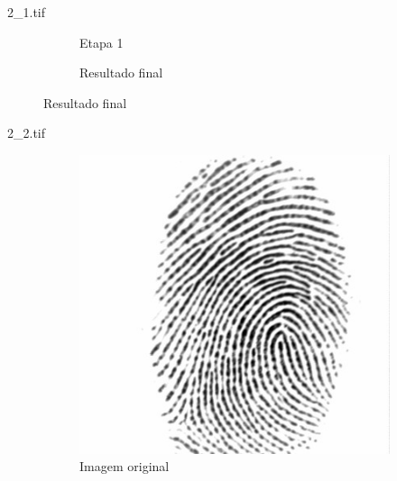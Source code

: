 \documentclass{beamer}
\begin{document}
\begin{frame}{2\_1.tif}
\begin{figure}
\begin{subfigure}[!ht]{0.32\textwidth}
                \caption{Etapa 1}
            \end{subfigure}
            \begin{subfigure}[!ht]{0.32\textwidth}
                \caption{Resultado final}
            \end{subfigure}
        \end{figure}
    \end{frame}

    \begin{frame}{2\_2.tif}
        \begin{figure}
            \centering
            \begin{subfigure}[!ht]{0.32\textwidth}
                \includegraphics[width=\columnwidth]{Fingerprints/2_2.jpg}
                \caption{Imagem original}
            \end{subfigure}
            \begin{subfigure}[!ht]{0.32\textwidth}

\end{subfigure}
\end{figure}
\end{frame}
\end{document}

